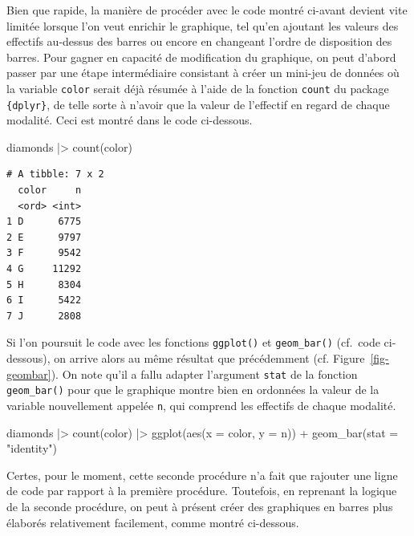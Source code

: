\documentclass[
  letterpaper,
]{book}
\newenvironment{Shaded}{\begin{snugshade}}{\end{snugshade}}
\newcommand{\AttributeTok}[1]{\textcolor[rgb]{0.40,0.45,0.13}{#1}}
\newcommand{\FunctionTok}[1]{\textcolor[rgb]{0.28,0.35,0.67}{#1}}
\newcommand{\NormalTok}[1]{\textcolor[rgb]{0.00,0.23,0.31}{#1}}
\newcommand{\SpecialCharTok}[1]{\textcolor[rgb]{0.37,0.37,0.37}{#1}}
\newcommand{\StringTok}[1]{\textcolor[rgb]{0.13,0.47,0.30}{#1}}
\begin{document}
Bien que rapide, la manière de procéder avec le code montré ci-avant
devient vite limitée lorsque l'on veut enrichir le graphique, tel qu'en
ajoutant les valeurs des effectifs au-dessus des barres ou encore en
changeant l'ordre de disposition des barres. Pour gagner en capacité de
modification du graphique, on peut d'abord passer par une étape
intermédiaire consistant à créer un mini-jeu de données où la variable
\texttt{color} serait déjà résumée à l'aide de la fonction
\texttt{count} du package \texttt{\{dplyr\}}, de telle sorte à n'avoir
que la valeur de l'effectif en regard de chaque modalité. Ceci est
montré dans le code ci-dessous.

\begin{Shaded}
\begin{Highlighting}[]
\NormalTok{diamonds }\SpecialCharTok{|\textgreater{}} 
  \FunctionTok{count}\NormalTok{(color)}
\end{Highlighting}
\end{Shaded}

\begin{verbatim}
# A tibble: 7 x 2
  color     n
  <ord> <int>
1 D      6775
2 E      9797
3 F      9542
4 G     11292
5 H      8304
6 I      5422
7 J      2808
\end{verbatim}

Si l'on poursuit le code avec les fonctions \texttt{ggplot()} et
\texttt{geom\_bar()} (cf.~code ci-dessous), on arrive alors au même
résultat que précédemment (cf. Figure~\ref{fig-geombar}). On note qu'il
a fallu adapter l'argument \texttt{stat} de la fonction
\texttt{geom\_bar()} pour que le graphique montre bien en ordonnées la
valeur de la variable nouvellement appelée \texttt{n}, qui comprend les
effectifs de chaque modalité.

\begin{Shaded}
\begin{Highlighting}[]
\NormalTok{diamonds }\SpecialCharTok{|\textgreater{}} 
  \FunctionTok{count}\NormalTok{(color) }\SpecialCharTok{|\textgreater{}}
  \FunctionTok{ggplot}\NormalTok{(}\FunctionTok{aes}\NormalTok{(}\AttributeTok{x =}\NormalTok{ color, }\AttributeTok{y =}\NormalTok{ n)) }\SpecialCharTok{+}
     \FunctionTok{geom\_bar}\NormalTok{(}\AttributeTok{stat =} \StringTok{"identity"}\NormalTok{)}
\end{Highlighting}
\end{Shaded}

Certes, pour le moment, cette seconde procédure n'a fait que rajouter
une ligne de code par rapport à la première procédure. Toutefois, en
reprenant la logique de la seconde procédure, on peut à présent créer
des graphiques en barres plus élaborés relativement facilement, comme
montré ci-dessous.
\end{document}
